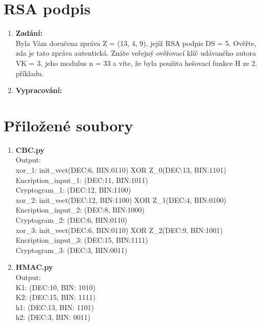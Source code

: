 \documentclass[10pt, a4paper]{article}%
\begin{document}
		\section*{\large{\textbf{RSA podpis}}}
		\begin{enumerate}
			\item \textbf{Zadání:}\\
				Byla Vám doručena zpráva Z = (13, 4, 9), jejíž RSA podpis DS = 5. Ověřte, zda je tato zpráva
				autentická. Znáte veřejný ověřovací klíč udávaného autora VK = 3, jeho modulus n = 33 a víte, že
				byla použita hešovací funkce H ze 2. příkladu.
			\item \textbf{Vypracování:}\\

		\end{enumerate}
	\clearpage
	\section*{\large{\textbf{Přiložené soubory}}}
	\begin{enumerate}
	\item \textbf{CBC.py}\\

	
	Output:\\
	xor\_1: init\_vect(DEC:6, BIN:0110) XOR Z\_0(DEC:13, BIN:1101)\\
	Encription\_input\_1: (DEC:11, BIN:1011)\\
	Cryptogram\_1: (DEC:12, BIN:1100)\\
	xor\_2: init\_vect(DEC:12, BIN:1100) XOR Z\_1(DEC:4, BIN:0100)\\
	Encription\_input\_2: (DEC:8, BIN:1000)\\
	Cryptogram\_2: (DEC:6, BIN:0110)\\
	xor\_3: init\_vect(DEC:6, BIN:0110) XOR Z\_2(DEC:9, BIN:1001)\\
	Encription\_input\_3: (DEC:15, BIN:1111)\\
	Cryptogram\_3: (DEC:3, BIN:0011)
	\item \textbf{HMAC.py}\\
	
	Output:\\
	K1: (DEC:10, BIN: 1010)\\
	K2: (DEC:15, BIN: 1111)\\
	h1: (DEC:13, BIN: 1101)\\
	h2: (DEC:3, BIN: 0011)
\end{enumerate}
\end{document}
